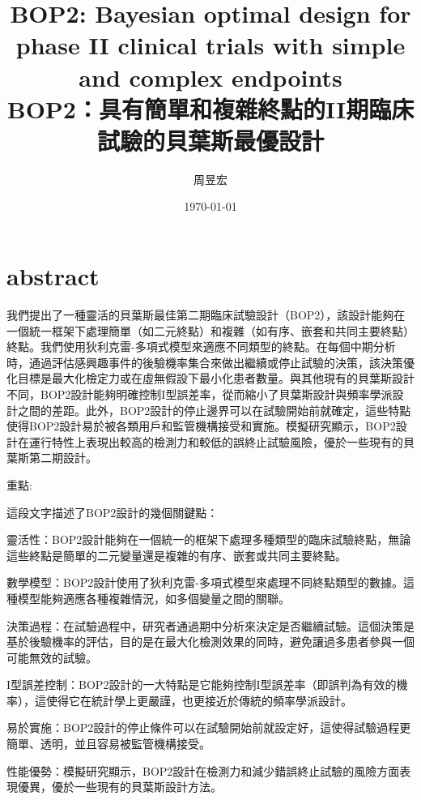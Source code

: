 
\title{ BOP2: Bayesian optimal design for phase II clinical trials with simple and complex endpoints\\BOP2：具有簡單和複雜終點的II期臨床試驗的貝葉斯最優設計}
\author{{周昱宏}}
\date{{\TT \today}}

\maketitle
\fontsize{12}{22 pt}\selectfont
\doublespacing

\section{abstract}

我們提出了一種靈活的貝葉斯最佳第二期臨床試驗設計（BOP2），該設計能夠在一個統一框架下處理簡單（如二元終點）和複雜（如有序、嵌套和共同主要終點）終點。我們使用狄利克雷-多項式模型來適應不同類型的終點。在每個中期分析時，通過評估感興趣事件的後驗機率集合來做出繼續或停止試驗的決策，該決策優化目標是最大化檢定力或在虛無假設下最小化患者數量。與其他現有的貝葉斯設計不同，BOP2設計能夠明確控制I型誤差率，從而縮小了貝葉斯設計與頻率學派設計之間的差距。此外，BOP2設計的停止邊界可以在試驗開始前就確定，這些特點使得BOP2設計易於被各類用戶和監管機構接受和實施。模擬研究顯示，BOP2設計在運行特性上表現出較高的檢測力和較低的誤終止試驗風險，優於一些現有的貝葉斯第二期設計。

重點:

這段文字描述了BOP2設計的幾個關鍵點：

靈活性：BOP2設計能夠在一個統一的框架下處理多種類型的臨床試驗終點，無論這些終點是簡單的二元變量還是複雜的有序、嵌套或共同主要終點。

數學模型：BOP2設計使用了狄利克雷-多項式模型來處理不同終點類型的數據。這種模型能夠適應各種複雜情況，如多個變量之間的關聯。

決策過程：在試驗過程中，研究者通過期中分析來決定是否繼續試驗。這個決策是基於後驗機率的評估，目的是在最大化檢測效果的同時，避免讓過多患者參與一個可能無效的試驗。

I型誤差控制：BOP2設計的一大特點是它能夠控制I型誤差率（即誤判為有效的機率），這使得它在統計學上更嚴謹，也更接近於傳統的頻率學派設計。

易於實施：BOP2設計的停止條件可以在試驗開始前就設定好，這使得試驗過程更簡單、透明，並且容易被監管機構接受。

性能優勢：模擬研究顯示，BOP2設計在檢測力和減少錯誤終止試驗的風險方面表現優異，優於一些現有的貝葉斯設計方法。

